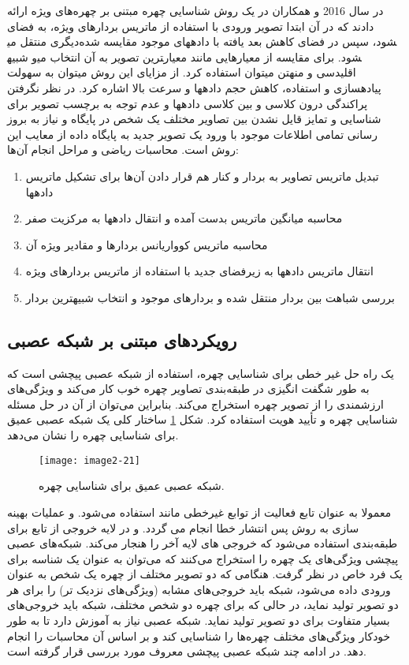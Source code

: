 \noindent
در سال 2016  و همکاران در \cite{7854053} یک روش شناسایی چهره مبتنی بر چهره‌های ویژه ارائه دادند که در آن ابتدا تصویر ورودی با استفاده از ماتریس بردارهای ویژه، به فضای دیگری منتقل می‎شود، سپس در فضای کاهش بعد یافته با داده‏های موجود مقایسه شده و شبیه‎ترین تصویر به آن انتخاب می‎شود. برای مقایسه از معیارهایی مانند معیار اقلیدسی و منهتن می‏توان استفاده کرد. از مزایای این روش می‏توان به سهولت پیاده‏سازی و استفاده، کاهش حجم داده‏ها و سرعت بالا اشاره کرد. در نظر نگرفتن پراکندگی درون کلاسی و بین کلاسی داده‏ها و عدم توجه به برچسب تصویر برای شناسایی و تمایز قایل نشدن بین تصاویر مختلف یک شخص در پایگاه و نیاز به بروز رسانی تمامی اطلاعات موجود با ورود یک تصویر جدید به پایگاه داده از معایب این روش است. 
محاسبات ریاضی و مراحل انجام آن‌ها:
\begin{enumerate}
\item
	تبدیل ماتریس تصاویر به بردار و کنار هم قرار دادن آن‌ها برای تشکیل ماتریس داده‏ها
\item 
	محاسبه‏ میانگین ماتریس بدست آمده و انتقال داده‏ها به مرکزیت صفر
\item
محاسبه‏ ماتریس کوواریانس بردارها و مقادیر ویژه‏ آن
\item
انتقال ماتریس داده‏ها به زیرفضای جدید با استفاده از ماتریس بردارهای ویژه
\item
	بررسی شباهت بین بردار منتقل شده و بردارهای موجود و انتخاب شبیه‏ترین بردار
\end{enumerate}
 
\subsection{رویکردهای مبتنی بر شبکه عصبی}
یک راه حل غیر خطی برای شناسایی چهره، استفاده از شبکه‌ عصبی پیچشی است که به طور شگفت انگیزی در طبقه‌بندی تصاویر چهره خوب کار می‌کند و ویژگی‌های ارزشمندی را از تصویر چهره استخراج می‌کند. بنابراین می‌توان از آن در حل مسئله شناسایی چهره‌ و تأیید هویت استفاده کرد. شکل \ref{image2-21} ساختار کلی یک شبکه عصبی عمیق برای شناسایی چهره را نشان می‌دهد.
 
\begin{figure}[h]
\centering
  \texttt{[image: image2-21]}
  \caption{شبکه عصبی عمیق برای شناسایی چهره.}
  \label{image2-21}
\end{figure}

\noindent
معمولا به عنوان تابع فعالیت از توابع غیرخطی مانند   استفاده می‌شود. و عملیات بهینه سازی به روش پس انتشار خطا انجام می گردد. و در لایه خروجی از تابع  برای طبقه‌بندی استفاده می‌شود که خروجی های لایه آخر را هنجار می‌کند. شبکه‌های عصبی پیچشی ویژگی‌های یک چهره را استخراج می‌کنند که می‌توان به عنوان یک شناسه برای یک فرد خاص در نظر گرفت. هنگامی که دو تصویر مختلف از چهره یک شخص به عنوان ورودی داده می‌شود، شبکه باید خروجی‌های مشابه (ویژگی‌های نزدیک تر) را برای هر دو تصویر تولید نماید، در حالی که برای چهره دو شخص مختلف، شبکه باید خروجی‌های بسیار متفاوت برای دو تصویر تولید نماید. شبکه عصبی نیاز به آموزش دارد تا به طور خودکار ویژگی‌های مختلف چهره‌ها را شناسایی کند و بر اساس آن محاسبات را انجام دهد. در ادامه چند شبکه عصبی پیچشی معروف مورد بررسی قرار گرفته است.


